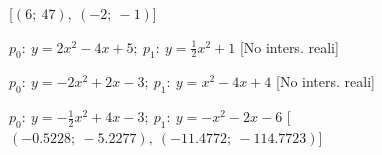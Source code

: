 \begin{esercizio}
\begin{enumeratea}
   \hfill [$\left (6;~47 \right ),~\left (-2;~-1 \right )$]
  \item  $p_0:~y=2 x^2 -4 x +5;~p_1:~y=\frac{1}{2} x^2 +1$
   \hfill [No inters. reali]
  \item  $p_0:~y=-2 x^2 +2 x -3;~p_1:~y=x^2 -4 x +4$
   \hfill [No inters. reali]
  \item  $p_0:~y=-\frac{1}{2} x^2 +4 x -3;~p_1:~y=- x^2 -2 x -6$
   \hfill [$\left (-0.5228;~-5.2277 \right ),~\left (-11.4772;~-114.7723 \right 
)$]
 \end{enumeratea}
\end{esercizio}

